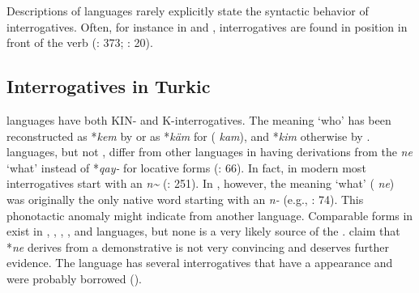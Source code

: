 Descriptions of  languages rarely explicitly state the syntactic behavior of interrogatives. Often, for instance in  and , interrogatives are found in  position in front of the verb (\citealt{Boeschoten1998}: 373; \citealt{Muhamedowa2016}: 20).

\subsection{Interrogatives in Turkic}\label{sec:5.11.3}
\largerpage
{} languages have both KIN- and K-interrogatives. The   meaning ‘who’ has been reconstructed as *\textit{kem} by \citet[74]{Róna-Tas1998} or as *\textit{käm} for  ( \textit{kam}), and *\textit{kim} otherwise by \cite[64, 69]{Schönig1999}.  languages, but not , differ from other  languages in having derivations from the  \textit{ne} ‘what’ instead of *\textit{qay-} for locative forms (\citealt{Schönig1999}: 66). In fact, in modern  most interrogatives start with an \textit{n{\textasciitilde}} (\citealt{GökselKerslake2005}: 251). In , however, the  meaning ‘what’ ( \textit{ne}) was originally the only native word starting with an \textit{n-} (e.g., \citealt{Róna-Tas1998}: 74). This phonotactic anomaly might indicate  from another language. Comparable forms in  exist in , , , , and  languages, but none is a very likely source of the  .  claim that *\textit{ne} derives from a  demonstrative is not very convincing and deserves further evidence. The  language  has several interrogatives that have a  appearance and were probably borrowed ().

